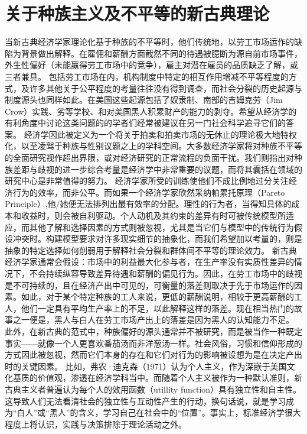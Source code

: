 \documentclass[UTF8]{ctexart}
\begin{document}
\section{关于种族主义及不平等的新古典理论}当新古典经济学家理论化基于种族的不平等时，他们传统地，以劳工市场运作的缺陷为背景做出解释\cite{02}。在雇佣和薪酬方面截然不同的待遇被臆断为源自前市场事件，外生性偏好（未能赢得劳工市场中的竞争），雇主对潜在雇员的品质缺乏了解，或三者兼具。
包括劳工市场在内，机构制度中特定的相互作用增减不平等程度的方式，及许多其他关于公平程度的考量往往没有得到调查，而社会分裂的历史起源与制度源头也同样如此。在美国这些起源包括了奴隶制、南部的吉姆克劳（Jim Crow）实践、劣等学校、和对美国黑人积累财产的能力的剥夺。希望从经济学的有利角度中讨论这类问题的的学者们经常被建议在另一门社会科学追寻它们的答案。\cite{03}
经济学因此被定义为一个将关于拍卖和拍卖市场的无休止的理论极大地特权化，以至凌驾于种族与性别议题之上的学科空间。大多数经济学家将对种族不平等的全面研究视作超出界限，或对经济研究的正常流程的负面干扰。我们则指出对种族差距与歧视的进一步综合考量是经济学中非常重要的议题，而将其囊括在领域的研究中心是非常值得的努力。
经济学家所受的训练使他们不成比例地过分关注经济行为的效率，而非公平。而如果一个经济学家欣然采纳帕累托原理（Pareto Principle）,他/她便无法排列出最有效率的分配。理性的行为者，当得知具体的成本和收益时，则会被自利驱动。个人动机及其约束的差异有时可被传统模型所适应，而其他了解和选择因素的方式则被忽视，尤其是当它们与模型中的传统行为假设冲突时。构建模型要求对许多现实细节的抽象化，而我们希望加以考量的，则是抽象的特定选择如何削弱用于解释社会分裂和群体间不平等的理论效力。
新古典经济学家通常会假设：市场中的利益最大化参与者，在生产率没有实质性差异的情况下，不会持续纵容导致差异待遇和薪酬的偏见行为。因此，在劳工市场中的歧视是不可持续的，且在经济产出中可见的，可衡量的落差则取决于先于市场运作的因素。如此，对于某个特定种族的工人来说，更低的薪酬说明，相较于更高薪酬的工人，他们一定具有平均生产率上的不足，以此解释这样的落差。现在相当热门的故事之一便是，黑人与白人在劳工市场产出上的落差是因为黑人的认知能力不足。\cite{04}
此外，在新古典的范式中，种族偏好的源头通常并不被研究，而是被当作一种既定事实——就像一个人更喜欢番茄汤而非洋葱汤一样。社会风俗，习惯和信仰形成的方式因此被忽视，然而它们本身的存在和它们对行为的影响被设想为是在决定产出时的关键因素。\cite{05}
比如，弗农·迪克森（1971）认为个人主义，作为深嵌于美国文化基质的价值观，渗透在经济学科当中。而随着个人主义被作为一种默认准则，新古典主义者普遍认为每个人的效用函数（utillity function）具有独立性和自主性。这导致人们无法看清社会的独立性与互动性产生的行动，换句话说，就是学习成为“白人”或“黑人”的含义，学习自己在社会中的“位置”。事实上，标准经济学很大程度上将认识，实践与决策排除于理论活动之外。\cite{06}
\end{document}
